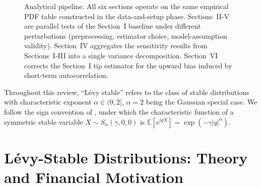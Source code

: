 \documentclass[12pt,a4paper]{article}
\begin{document}
\begin{figure}[htbp]
{%
}%
\caption{Analytical pipeline. All six sections operate on the same empirical
PDF table constructed in the data-and-setup phase. Sections~II-V are parallel
tests of the Section~I baseline under different perturbations (preprocessing,
estimator choice, model-assumption validity). Section~IV aggregates the
sensitivity results from Sections~I-III into a single variance decomposition.
Section~VI corrects the Section~I tip estimator for the upward bias induced by
short-term autocorrelation.}
\label{fig:pipeline}
\end{figure}

Throughout this review, ``Lévy stable'' refers to the class of stable
distributions with characteristic exponent $\alpha \in (0,2]$, $\alpha = 2$
being the Gaussian special case. We follow the sign convention of
\textcite{SamorodTaqqu1994}, under which the characteristic function of a
symmetric stable variable $X \sim S_\alpha(\gamma,0,0)$ is
$\mathbb{E}[e^{iqX}] = \exp(-\gamma|q|^\alpha)$.


\section{Lévy-Stable Distributions: Theory and Financial Motivation}
\label{sec:stable}
\end{document}
